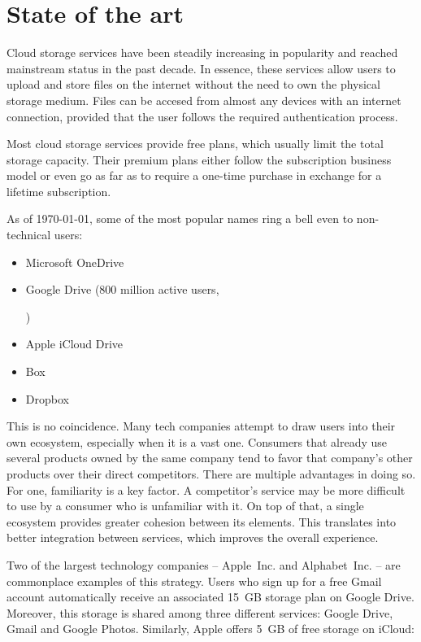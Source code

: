 \chapter{State of the art}

Cloud storage services have been steadily increasing in popularity and reached mainstream status in the past decade. In essence, these services allow users to upload and store files on the internet without the need to own the physical storage medium. Files can be accesed from almost any devices with an internet connection, provided that the user follows the required authentication process.

Most cloud storage services provide free plans, which usually limit the total storage capacity. Their premium plans either follow the subscription business model or even go as far as to require a one-time purchase in exchange for a lifetime subscription.

As of \monthyeardate\today, some of the most popular\cite{google_plans_to_leverage} names ring a bell even to non-technical users:
\begin{itemize}
\item Microsoft OneDrive
\item Google Drive (800 million active users, \date{March 2017})
\item Apple iCloud Drive
\item Box
\item Dropbox
\end{itemize}

This is no coincidence. Many tech companies attempt to draw users into their own ecosystem, especially when it is a vast one. Consumers that already use several products owned by the same company tend to favor that company's other products over their direct competitors. There are multiple advantages in doing so. For one, familiarity is a key factor. A competitor's service may be more difficult to use by a consumer who is unfamiliar with it. On top of that, a single ecosystem provides greater cohesion between its elements. This translates into better integration between services, which improves the overall experience.

Two of the largest technology companies -- \mbox{Apple Inc.} and \mbox{Alphabet Inc.} -- are commonplace examples of this strategy. Users who sign up for a free Gmail account automatically receive an associated \mbox{15 GB} storage plan on Google Drive. Moreover, this storage is shared among three different services: Google Drive, Gmail and Google Photos. Similarly, Apple offers \mbox{5 GB} of free storage on iCloud:

